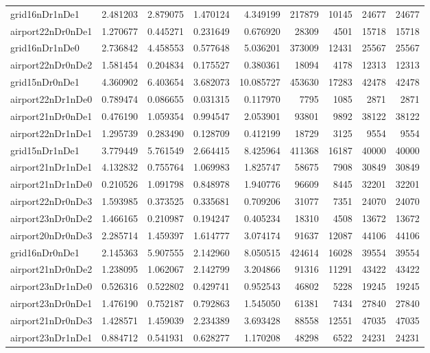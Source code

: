 \begin{longtable}{|l|r|r|r|r|r|r|r|r|}
grid16nDr1nDe1 & 2.481203 & 2.879075 & 1.470124 & 4.349199 & 217879 & 10145 & 24677 & 24677 \\
airport22nDr0nDe1 & 1.270677 & 0.445271 & 0.231649 & 0.676920 & 28309 & 4501 & 15718 & 15718 \\
grid16nDr1nDe0 & 2.736842 & 4.458553 & 0.577648 & 5.036201 & 373009 & 12431 & 25567 & 25567 \\
airport22nDr0nDe2 & 1.581454 & 0.204834 & 0.175527 & 0.380361 & 18094 & 4178 & 12313 & 12313 \\
grid15nDr0nDe1 & 4.360902 & 6.403654 & 3.682073 & 10.085727 & 453630 & 17283 & 42478 & 42478 \\
airport22nDr1nDe0 & 0.789474 & 0.086655 & 0.031315 & 0.117970 & 7795 & 1085 & 2871 & 2871 \\
airport21nDr0nDe1 & 0.476190 & 1.059354 & 0.994547 & 2.053901 & 93801 & 9892 & 38122 & 38122 \\
airport22nDr1nDe1 & 1.295739 & 0.283490 & 0.128709 & 0.412199 & 18729 & 3125 & 9554 & 9554 \\
grid15nDr1nDe1 & 3.779449 & 5.761549 & 2.664415 & 8.425964 & 411368 & 16187 & 40000 & 40000 \\
airport21nDr1nDe1 & 4.132832 & 0.755764 & 1.069983 & 1.825747 & 58675 & 7908 & 30849 & 30849 \\
airport21nDr1nDe0 & 0.210526 & 1.091798 & 0.848978 & 1.940776 & 96609 & 8445 & 32201 & 32201 \\
airport22nDr0nDe3 & 1.593985 & 0.373525 & 0.335681 & 0.709206 & 31077 & 7351 & 24070 & 24070 \\
airport23nDr0nDe2 & 1.466165 & 0.210987 & 0.194247 & 0.405234 & 18310 & 4508 & 13672 & 13672 \\
airport20nDr0nDe3 & 2.285714 & 1.459397 & 1.614777 & 3.074174 & 91637 & 12087 & 44106 & 44106 \\
grid16nDr0nDe1 & 2.145363 & 5.907555 & 2.142960 & 8.050515 & 424614 & 16028 & 39554 & 39554 \\
airport21nDr0nDe2 & 1.238095 & 1.062067 & 2.142799 & 3.204866 & 91316 & 11291 & 43422 & 43422 \\
airport23nDr1nDe0 & 0.526316 & 0.522802 & 0.429741 & 0.952543 & 46802 & 5228 & 19245 & 19245 \\
airport23nDr0nDe1 & 1.476190 & 0.752187 & 0.792863 & 1.545050 & 61381 & 7434 & 27840 & 27840 \\
airport21nDr0nDe3 & 1.428571 & 1.459039 & 2.234389 & 3.693428 & 88558 & 12551 & 47035 & 47035 \\
airport23nDr1nDe1 & 0.884712 & 0.541931 & 0.628277 & 1.170208 & 48298 & 6522 & 24231 & 24231 \\

\end{longtable}
